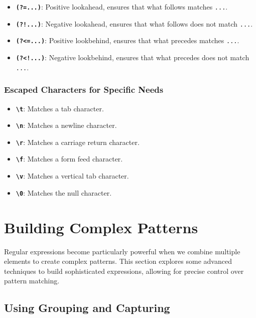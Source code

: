 \documentclass[
  letterpaper,
  DIV=11,
  numbers=noendperiod]{scrreprt}
\providecommand{\tightlist}{%
  \setlength{\itemsep}{0pt}\setlength{\parskip}{0pt}}\usepackage{longtable,booktabs,array}
\begin{document}
\begin{itemize}
\tightlist
\item
  \textbf{\texttt{(?=...)}}: Positive lookahead, ensures that what
  follows matches \texttt{...}.
\item
  \textbf{\texttt{(?!...)}}: Negative lookahead, ensures that what
  follows does not match \texttt{...}.
\item
  \textbf{\texttt{(?\textless{}=...)}}: Positive lookbehind, ensures
  that what precedes matches \texttt{...}.
\item
  \textbf{\texttt{(?\textless{}!...)}}: Negative lookbehind, ensures
  that what precedes does not match \texttt{...}.
\end{itemize}

\hypertarget{escaped-characters-for-specific-needs}{%
\subsubsection{Escaped Characters for Specific
Needs}\label{escaped-characters-for-specific-needs}}

\begin{itemize}
\tightlist
\item
  \textbf{\texttt{\textbackslash{}t}}: Matches a tab character.
\item
  \textbf{\texttt{\textbackslash{}n}}: Matches a newline character.
\item
  \textbf{\texttt{\textbackslash{}r}}: Matches a carriage return
  character.
\item
  \textbf{\texttt{\textbackslash{}f}}: Matches a form feed character.
\item
  \textbf{\texttt{\textbackslash{}v}}: Matches a vertical tab character.
\item
  \textbf{\texttt{\textbackslash{}0}}: Matches the null character.
\end{itemize}

\hypertarget{building-complex-patterns}{%
\section{Building Complex Patterns}\label{building-complex-patterns}}

Regular expressions become particularly powerful when we combine
multiple elements to create complex patterns. This section explores some
advanced techniques to build sophisticated expressions, allowing for
precise control over pattern matching.

\hypertarget{using-grouping-and-capturing}{%
\subsection{Using Grouping and
Capturing}\label{using-grouping-and-capturing}}
\end{document}
